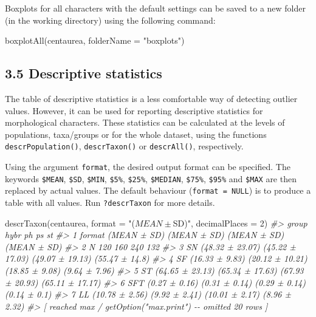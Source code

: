 \documentclass[
  11pt,
  a4paper]{article}
\newenvironment{Shaded}{\begin{snugshade}}{\end{snugshade}}
\newcommand{\AttributeTok}[1]{\textcolor[rgb]{0.77,0.63,0.00}{#1}}
\newcommand{\CommentTok}[1]{\textcolor[rgb]{0.56,0.35,0.01}{\textit{#1}}}
\newcommand{\DecValTok}[1]{\textcolor[rgb]{0.00,0.00,0.81}{#1}}
\newcommand{\FunctionTok}[1]{\textcolor[rgb]{0.00,0.00,0.00}{#1}}
\newcommand{\NormalTok}[1]{#1}
\newcommand{\StringTok}[1]{\textcolor[rgb]{0.31,0.60,0.02}{#1}}
\begin{document}
Boxplots for all characters with the default settings can be saved to a
new folder (in the working directory) using the following command:

\begin{Shaded}
\begin{Highlighting}[]
\FunctionTok{boxplotAll}\NormalTok{(centaurea, }\AttributeTok{folderName =} \StringTok{"boxplots"}\NormalTok{)}
\end{Highlighting}
\end{Shaded}

\hypertarget{descriptive-statistics}{%
\subsection{3.5 Descriptive statistics}\label{descriptive-statistics}}

The table of descriptive statistics is a less comfortable way of
detecting outlier values. However, it can be used for reporting
descriptive statistics for morphological characters. These statistics
can be calculated at the levels of populations, taxa/groups or for the
whole dataset, using the functions \texttt{descrPopulation()},
\texttt{descrTaxon()} or \texttt{descrAll()}, respectively.

Using the argument \texttt{format}, the desired output format can be
specified. The keywords \texttt{\$MEAN}, \texttt{\$SD}, \texttt{\$MIN},
\texttt{\$5\%}, \texttt{\$25\%}, \texttt{\$MEDIAN}, \texttt{\$75\%},
\texttt{\$95\%} and \texttt{\$MAX} are then replaced by actual values.
The default behaviour (\texttt{format\ =\ NULL}) is to produce a table
with all values. Run \texttt{?descrTaxon} for more details.

\begin{Shaded}
\begin{Highlighting}[]
\FunctionTok{descrTaxon}\NormalTok{(centaurea, }\AttributeTok{format =} \StringTok{"($MEAN ± $SD)"}\NormalTok{, }\AttributeTok{decimalPlaces =} \DecValTok{2}\NormalTok{)}
\CommentTok{\#\textgreater{}    group            hybr              ph              ps              st}
\CommentTok{\#\textgreater{} 1 format     (MEAN ± SD)     (MEAN ± SD)     (MEAN ± SD)     (MEAN ± SD)}
\CommentTok{\#\textgreater{} 2      N             120             160             240             132}
\CommentTok{\#\textgreater{} 3     SN (48.32 ± 23.07) (45.22 ± 17.03) (49.07 ± 19.13)  (55.47 ± 14.8)}
\CommentTok{\#\textgreater{} 4     SF  (16.33 ± 9.83) (20.12 ± 10.21)  (18.85 ± 9.08)   (9.64 ± 7.96)}
\CommentTok{\#\textgreater{} 5     ST (64.65 ± 23.13) (65.34 ± 17.63) (67.93 ± 20.93) (65.11 ± 17.17)}
\CommentTok{\#\textgreater{} 6    SFT   (0.27 ± 0.16)   (0.31 ± 0.14)   (0.29 ± 0.14)    (0.14 ± 0.1)}
\CommentTok{\#\textgreater{} 7     LL  (10.78 ± 2.56)   (9.92 ± 2.41)  (10.01 ± 2.17)   (8.96 ± 2.32)}
\CommentTok{\#\textgreater{}  [ reached \textquotesingle{}max\textquotesingle{} / getOption("max.print") {-}{-} omitted 20 rows ]}
\end{Highlighting}
\end{Shaded}
\end{document}
